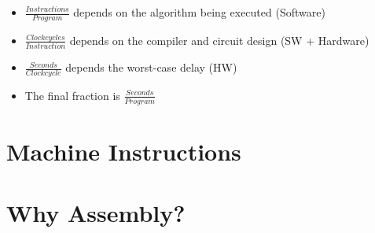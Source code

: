 \documentclass{article}
\begin{document}
\begin{itemize}
\begin{itemize}
\begin{itemize}
						\begin{itemize}
							\item $\displaystyle\frac{Instructions}{Program}$ depends on the algorithm being executed (Software)
							\item $\displaystyle\frac{Clock cycles}{Instruction}$ depends on the compiler and circuit design (SW + Hardware)
							\item $\displaystyle\frac{Seconds}{Clock cycle}$ depends the worst-case delay (HW)
							\item The final fraction is $\displaystyle\frac{Seconds}{Program}$
						\end{itemize}
				\end{itemize}
		\end{itemize}
\end{itemize}

\section{Machine Instructions}

\section{Why Assembly?}
\end{document}

